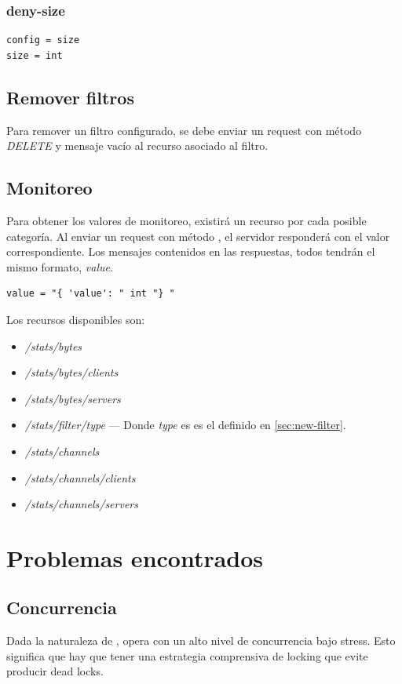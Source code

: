 \documentclass[11pt,a4paper,titlepage]{article}
\begin{document}
\subsubsection{deny-size}
\begin{verbatim}
config = size
size = int
\end{verbatim}

\subsection{Remover filtros}
Para remover un filtro configurado, se debe enviar un request con método \textit{DELETE} y mensaje vacío al recurso asociado al filtro.

\subsection{Monitoreo}
Para obtener los valores de monitoreo, existirá un recurso por cada posible categoría.
Al enviar un request con método , el servidor responderá con el valor correspondiente.
Los mensajes contenidos en las respuestas, todos tendrán el mismo formato, \textit{value}.
\begin{verbatim}
value = "{ 'value': " int "} "
\end{verbatim}

Los recursos disponibles son:
\begin{itemize}
    \item \textit{/stats/bytes}
    \item \textit{/stats/bytes/clients}
    \item \textit{/stats/bytes/servers}
    \item \textit{/stats/filter/type} --- Donde \textit{type} es es el definido en \ref{sec:new-filter}.
    \item \textit{/stats/channels}
    \item \textit{/stats/channels/clients}
    \item \textit{/stats/channels/servers}
\end{itemize}

\section{Problemas encontrados}
    \subsection{Concurrencia}
    Dada la naturaleza de \duta, opera con un alto nivel de concurrencia bajo stress.
    Esto significa que hay que tener una estrategia comprensiva de locking que evite producir dead locks.
\end{document}
